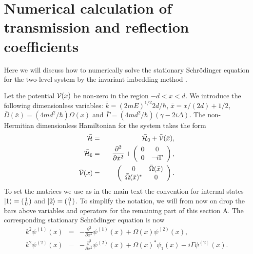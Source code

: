 
\chapter{Numerical calculation of transmission and reflection coefficients}
\label{Appendix:NumericalCalculationOfTandR}

%

Here we will discuss how to numerically solve  the
stationary Schr\"odinger equation for the two-level system
by the invariant imbedding method \cite{Singer1982,Band1994}.
%

%
Let the potential ${\cal V}(x)$ be non-zero in the region $-d < x < d$.
We  introduce the following dimensionless variables: $\bar k = (2mE)^{1/2}2d/\hbar$, $\bar x = x/(2d) + 1/2$,
$\bar\Omega (\bar x)= (4md^2/\hbar) \Omega(x)$ and $\bar\Gamma = (4md^2/\hbar) (\gamma-2i\Delta)$.
%
%
The non-Hermitian dimensionless Hamiltonian for the system takes the form
%
\begin{eqnarray}
	\bar {\cal H}&=& \bar {\cal H}_{0}+\bar {\cal V}(\bar x), \\
	\bar {\cal H}_{0}&=&- \frac{\partial^2 }{\partial {\bar x}^2}+\left(\begin{array}{cc}
	0 & 0 \\
	0 & -i\bar\Gamma
	\end{array}\right), \\
	\bar {\cal V}(\bar x)&=& \left(\begin{array}{cc}
	0 & \bar\Omega (\bar x)\\
	\bar\Omega (\bar x)^{*} & 0
	\end{array}\right).
\end{eqnarray}
%
To set the matrices we use as in the main text the convention for internal states $\ket{1} = \left(\begin{smallmatrix}1\\0\end{smallmatrix}\right)$ and $\ket{2} = \left(\begin{smallmatrix}0\\1\end{smallmatrix}\right)$.
%
To simplify the notation, we will from now on drop the bars above variables and operators for the remaining part of this section A.
The corresponding stationary Schr\"odinger equation is now
%
\begin{eqnarray}
	k^{2} \psi^{(1)}(x)&=&-\frac{\partial^2}{\partial x^2}\psi^{(1)}(x)+\Omega(x) \psi^{(2)}(x),
	\nonumber \\
	k^{2} \psi^{(2)}(x)&=&-\frac{\partial^2}{\partial x^2}\psi^{(2)}(x)+\Omega(x)^* \psi_{1}(x)-i \Gamma \psi^{(2)}(x).
\end{eqnarray}
